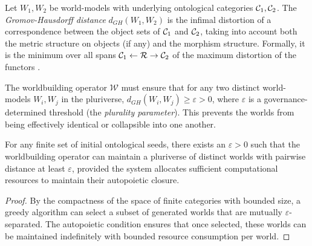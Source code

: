 \begin{definition}
Let $W_1, W_2$ be world-models with underlying ontological categories $\mathcal{C}_1, \mathcal{C}_2$. The \emph{Gromov-Hausdorff distance} $d_{GH}(W_1, W_2)$ is the infimal distortion of a correspondence between the object sets of $\mathcal{C}_1$ and $\mathcal{C}_2$, taking into account both the metric structure on objects (if any) and the morphism structure. Formally, it is the minimum over all spans $\mathcal{C}_1 \leftarrow \mathcal{R} \rightarrow \mathcal{C}_2$ of the maximum distortion of the functors \cite{burago2001course}.
\end{definition}

\begin{definition}
The worldbuilding operator $\mathcal{W}$ must ensure that for any two distinct world-models $W_i, W_j$ in the pluriverse, $d_{GH}(W_i, W_j) \ge \varepsilon > 0$, where $\varepsilon$ is a governance-determined threshold (the \emph{plurality parameter}). This prevents the worlds from being effectively identical or collapsible into one another.
\end{definition}

\begin{theorem}
\label{thm:pluriverse_existence}
For any finite set of initial ontological seeds, there exists an $\varepsilon > 0$ such that the worldbuilding operator can maintain a pluriverse of distinct worlds with pairwise distance at least $\varepsilon$, provided the system allocates sufficient computational resources to maintain their autopoietic closure.
\end{theorem}
\begin{proof}
By the compactness of the space of finite categories with bounded size, a greedy algorithm can select a subset of generated worlds that are mutually $\varepsilon$-separated. The autopoietic condition ensures that once selected, these worlds can be maintained indefinitely with bounded resource consumption per world.
\end{proof}

